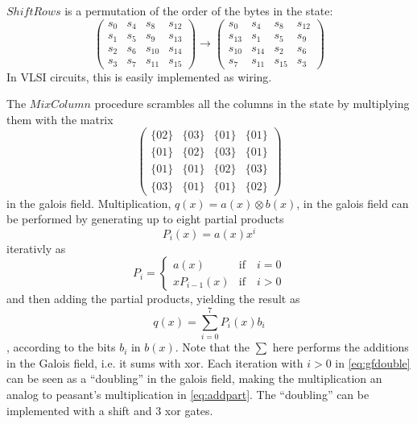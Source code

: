 $ShiftRows$ is a permutation of the order of the bytes in the state:
\begin{equation}
  \begin{pmatrix}
    s_0 & s_4 & s_8    & s_{12} \\
    s_1 & s_5 & s_9    & s_{13} \\
    s_2 & s_6 & s_{10} & s_{14} \\
    s_3 & s_7 & s_{11} & s_{15}
  \end{pmatrix} 
  \rightarrow
  \begin{pmatrix}
    s_0    & s_4    & s_8    & s_{12} \\
    s_{13} & s_1    & s_5    & s_9 \\
    s_{10} & s_{14} & s_2    & s_6 \\
    s_7    & s_{11} & s_{15} & s_3    
    \end{pmatrix}
\end{equation}
In VLSI circuits, this is easily implemented as wiring.

The $MixColumn$ procedure scrambles all the columns in the state
by multiplying them with the matrix
\begin{equation}
  \begin{pmatrix}
    \{02\} & \{03\} & \{01\} & \{01\} \\
    \{01\} & \{02\} & \{03\} & \{01\} \\
    \{01\} & \{01\} & \{02\} & \{03\} \\
    \{03\} & \{01\} & \{01\} & \{02\}
  \end{pmatrix}
  \label{eq:mixcol}
\end{equation}
in the galois field. Multiplication, $q(x)=a(x) \otimes b(x)$, in the
galois field can be performed by generating up to eight partial
products
\begin{equation}
  P_i(x) = a(x) x^i
\end{equation}
iterativly as 
\begin{equation} 
  P_i = 
  \begin{cases}
    a(x) & \text{if} \quad i = 0 \\
    x P_{i-1}(x) & \text{if} \quad i > 0
  \end{cases}
  \label{eq:gfdouble}
\end{equation}
and then adding the partial products, yielding the result as
\begin{equation}
  q(x) = \sum_{i=0}^{7} P_i(x) b_i
  \label{eq:addpart}
\end{equation}
, according to the bits $b_i$ in $b(x)$. Note that the $\sum$ here
performs the additions in the Galois field, i.e. it sums with
xor. Each iteration with $i > 0$ in \eqref{eq:gfdouble} can be seen as
a ``doubling'' in the galois field, making the multiplication an
analog to peasant's multiplication in \eqref{eq:addpart}. The
``doubling'' can be implemented with a shift and 3 xor gates.

